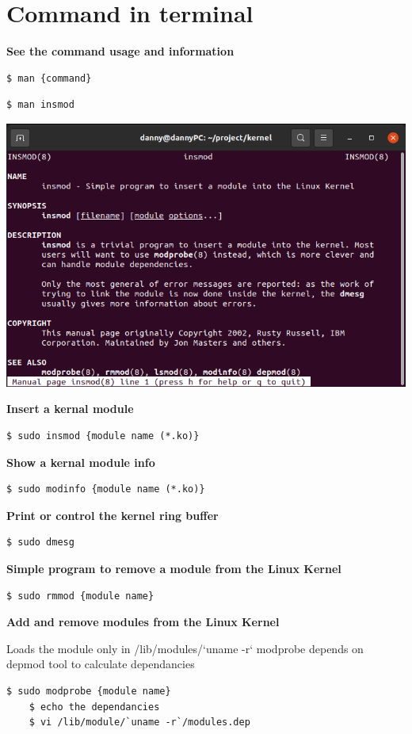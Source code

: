 \section{Command in terminal}

\textbf{See the command usage and information}
\begin{lstlisting}[style=bashStyle]
    $ man {command}
\end{lstlisting}
\begin{lstlisting}[style=bashStyle]
    $ man insmod
\end{lstlisting}
\begin{center}
    \includegraphics[width=\linewidth]{images/man_insmod.png}
\end{center}

\textbf{Insert a kernal module}
\begin{lstlisting}[style=bashStyle]
    $ sudo insmod {module name (*.ko)}
\end{lstlisting}

\textbf{Show a kernal module info}
\begin{lstlisting}[style=bashStyle]
    $ sudo modinfo {module name (*.ko)}
\end{lstlisting}

\textbf{Print or control the kernel ring buffer}
\begin{lstlisting}[style=bashStyle]
    $ sudo dmesg
\end{lstlisting}

\textbf{Simple program to remove a module from the Linux Kernel}
\begin{lstlisting}[style=bashStyle]
    $ sudo rmmod {module name}
\end{lstlisting}


\textbf{Add and remove modules from the Linux Kernel}

Loads the module only in /lib/modules/`uname -r`
modprobe depends on depmod tool to calculate dependancies
\begin{lstlisting}[style=bashStyle]
    $ sudo modprobe {module name}
    $ echo the dependancies
    $ vi /lib/module/`uname -r`/modules.dep
\end{lstlisting}









